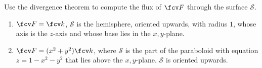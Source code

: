 Use the divergence theorem to compute the flux of $\fcv F$ through the surface $\mathcal S$.
\begin{enumerate}
\item $\fcv F=\fcv k$, $\mathcal S$ is the hemisphere, oriented upwards, with radius $1$, whose axis is the $z$-axis and whose base lies in the $x,y$-plane.
\item $\fcv F=(x^2+y^2) \fcv k$, where $\mathcal S$ is the part of the paraboloid with equation $z=1-x^2-y^2$ that lies above the $x,y$-plane. $\mathcal S$ is oriented upwards.
\end{enumerate}